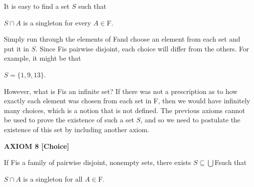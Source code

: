 \documentclass[12pt, a4paper]{article}
\begin{document}
\vspace{4mm}

\noindent It is easy to find a set $S$ such that\par

\vspace{4mm}

\centerline{$S\cap A$ is a singleton for every $A\in$\hspace{1mm}\rsfs F\rm .}

\vspace{4mm}

\noindent Simply run through the elements of \rsfs F\hspace{1mm}\rm and choose an element from each set and put it in $S$. Since \rsfs F\hspace{1mm}\rm is pairwise disjoint, each choice will differ from the others. For example, it might be that\par

\vspace{4mm}

\centerline{$S=\{1,9,13\}$.}

\vspace{4mm}

\noindent However, what is \rsfs F\hspace{1mm}\rm is an infinite set? If there was not a prescription as to how exactly each element was chosen from each set in \rsfs F\hspace{1mm}\rm, then we would have infinitely many choices, which is a notion that is not defined. The previous axioms cannot be used to prove the existence of such a set $S$, and so we need to postulate the existence of this set by including another axiom.\par

\newpage

\noindent\blacksquare\textbf{ AXIOM 8 [Choice]}

\vspace{4mm}

If \rsfs F\hspace{1mm}\rm is a family of pairwise disjoint, nonempty sets, there exists $S\subseteq\bigcup$\rsfs \hspace{1mm}F\hspace{1mm}\rm such that\par $S\cap A$ is a singleton for all $A\in$\rsfs\hspace{1mm}F\hspace{1mm}\rm.\par
\end{document}
